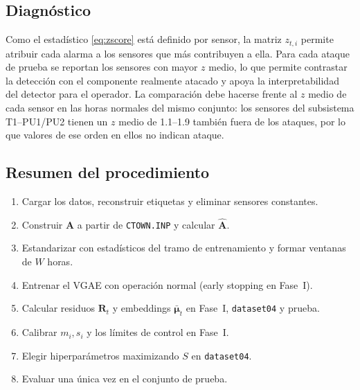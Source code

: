 \documentclass[11pt,a4paper]{article}
\newcommand{\A}{\mathbf{A}}
\newcommand{\Ahat}{\hat{\mathbf{A}}}
\begin{document}
\subsection{Diagnóstico}

Como el estadístico \eqref{eq:zscore} está definido por sensor, la matriz
$z_{t,i}$ permite atribuir cada alarma a los sensores que más contribuyen a ella. Para
cada ataque de prueba se reportan los sensores con mayor $z$ medio, lo que permite
contrastar la detección con el componente realmente atacado y apoya la
interpretabilidad del detector para el operador. La comparación debe hacerse frente al
$z$ medio de cada sensor en las horas normales del mismo conjunto: los sensores del
subsistema T1--PU1/PU2 tienen un $z$ medio de 1.1--1.9 también fuera de los ataques,
por lo que valores de ese orden en ellos no indican ataque.

\subsection{Resumen del procedimiento}

\begin{enumerate}[leftmargin=*]
\item Cargar los datos, reconstruir etiquetas y eliminar sensores constantes.
\item Construir $\A$ a partir de \texttt{CTOWN.INP} y calcular $\Ahat$.
\item Estandarizar con estadísticos del tramo de entrenamiento y formar ventanas de
  $W$ horas.
\item Entrenar el VGAE con operación normal (early stopping en Fase~I).
\item Calcular residuos $\mathbf{R}_t$ y embeddings $\bar{\bm\mu}_t$ en Fase~I,
  \texttt{dataset04} y prueba.
\item Calibrar $m_i,s_i$ y los límites de control en Fase~I.
\item Elegir hiperparámetros maximizando $S$ en \texttt{dataset04}.
\item Evaluar una única vez en el conjunto de prueba.
\end{enumerate}

\end{document}
